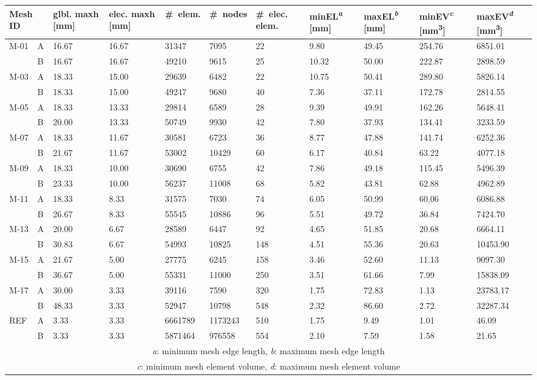 \begin{tabular}{p{1cm}p{0.5cm}p{1cm}p{1cm}|p{1.4cm}p{1.4cm}p{1cm}|p{1.3cm}p{1.3cm}p{1.3cm}p{1.3cm}}
\multicolumn{2}{l}{Mesh ID} & glbl. maxh [mm] & elec. maxh [mm] & \#~elem. & \#~nodes & \#~elec. elem. & minEL\textsuperscript{\emph{a}} [mm] & maxEL\textsuperscript{\emph{b}} [mm] & minEV\textsuperscript{\emph{c}} [mm\textsuperscript{3}] & maxEV\textsuperscript{\emph{d}} [mm\textsuperscript{3}]\\ \hline 
\multirow{2}{*}{M-01} &A & 16.67 & 16.67 & 31347 & 7095 & 22 & 9.80 & 49.45 & 254.76 & 6851.01\\ 
& B & 16.67 & 16.67 & 49210 & 9615 & 25 & 10.32 & 50.00 & 222.87 & 2898.59\\ 
\multirow{2}{*}{M-03} &A & 18.33 & 15.00 & 29639 & 6482 & 22 & 10.75 & 50.41 & 289.80 & 5826.14\\ 
& B & 18.33 & 15.00 & 49247 & 9680 & 40 & 7.36 & 37.11 & 172.78 & 2814.55\\ 
\multirow{2}{*}{M-05} &A & 18.33 & 13.33 & 29814 & 6589 & 28 & 9.39 & 49.91 & 162.26 & 5648.41\\ 
& B & 20.00 & 13.33 & 50749 & 9930 & 42 & 7.80 & 37.93 & 134.41 & 3233.59\\ 
\multirow{2}{*}{M-07} &A & 18.33 & 11.67 & 30581 & 6723 & 36 & 8.77 & 47.88 & 141.74 & 6252.36\\ 
& B & 21.67 & 11.67 & 53002 & 10429 & 60 & 6.17 & 40.84 & 63.22 & 4077.18\\ 
\multirow{2}{*}{M-09} &A & 18.33 & 10.00 & 30690 & 6755 & 42 & 7.86 & 49.18 & 115.45 & 5496.39\\ 
& B & 23.33 & 10.00 & 56237 & 11008 & 68 & 5.82 & 43.81 & 62.88 & 4962.89\\ 
\multirow{2}{*}{M-11} &A & 18.33 & 8.33 & 31575 & 7030 & 74 & 6.05 & 50.99 & 60.06 & 6086.88\\ 
& B & 26.67 & 8.33 & 55545 & 10886 & 96 & 5.51 & 49.72 & 36.84 & 7424.70\\ 
\multirow{2}{*}{M-13} &A & 20.00 & 6.67 & 28589 & 6447 & 92 & 4.65 & 51.85 & 20.68 & 6664.11\\ 
& B & 30.83 & 6.67 & 54993 & 10825 & 148 & 4.51 & 55.36 & 20.63 & 10453.90\\ 
\multirow{2}{*}{M-15} &A & 21.67 & 5.00 & 27775 & 6245 & 158 & 3.46 & 52.60 & 11.13 & 9097.30\\ 
& B & 36.67 & 5.00 & 55331 & 11000 & 250 & 3.51 & 61.66 & 7.99 & 15838.09\\ 
\multirow{2}{*}{M-17} &A & 30.00 & 3.33 & 39116 & 7590 & 320 & 1.75 & 72.83 & 1.13 & 23783.17\\ 
& B & 48.33 & 3.33 & 52947 & 10798 & 548 & 2.32 & 86.60 & 2.72 & 32287.34\\ \hline 
\multirow{2}{*}{REF} &A & 3.33 & 3.33 & 6661789 & 1173243 & 510 & 1.75 & 9.49 & 1.01 & 46.09\\ 
& B & 3.33 & 3.33 & 5871464 & 976558 & 554 & 2.10 & 7.59 & 1.58 & 21.65\\ 
\multicolumn{11}{c}{\emph{a}: minimum mesh edge length, \emph{b}: maximum mesh edge length}\\ 
\multicolumn{11}{c}{\emph{c}: minimum mesh element volume, \emph{d}: maximum mesh element volume}\\ 
\end{tabular}

